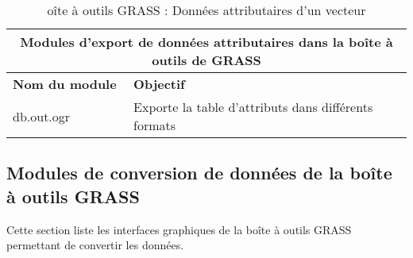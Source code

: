 \begin{table}[H]
\centering
 \begin{tabular}{|p{4cm}|p{10cm}|}
  \hline \multicolumn{2}{|c|}{\textbf{Modules d'export de données attributaires dans la boîte à outils de GRASS}} \\
  \hline \textbf{Nom du module} & \textbf{Objectif} \\
  \hline db.out.ogr & Exporte la table d'attributs dans différents formats  \\
\hline
\end{tabular}
\caption{oîte à outils GRASS : Données attributaires d'un vecteur}
\end{table}

\subsection{Modules de conversion de données de la boîte à outils GRASS}

Cette section liste les interfaces graphiques de la boîte à outils GRASS permettant de convertir les données.

